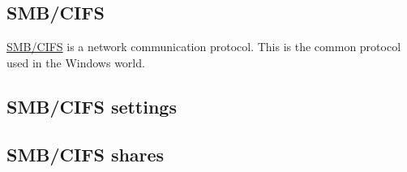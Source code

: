 

\subsection{SMB/CIFS}

\href{https://en.wikipedia.org/wiki/Server_Message_Block}{SMB/CIFS} is a network
communication protocol. This is the common protocol used in the Windows world.

\subsection{SMB/CIFS settings}


\subsection{SMB/CIFS shares}

